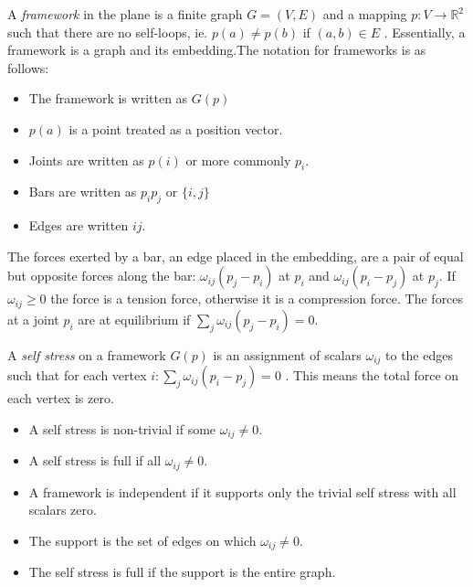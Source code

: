 \documentclass[11pt]{article}
\newcommand{\R}{\mathbb{R}}
\begin{document}
A \emph{framework} in the plane is a finite graph $G=(V,E)$ and a mapping $p: V \rightarrow \R^2$ such that there are no self-loops, ie. $p(a) \neq p(b)$ if $(a,b) \in E$ \cite{mccProof}. Essentially, a framework is a graph and its embedding.The notation for frameworks is as follows: 

\begin{itemize}
	\item The framework is written as $G(p)$
	\item $p(a)$ is a point treated as a position vector. 
	\item Joints are written as $p(i)$ or more commonly $p_i$.
	\item Bars are written as $p_ip_j$ or $\{i,j\}$
	\item Edges are written $ij$.
\end{itemize}

The forces exerted by a bar, an edge placed in the embedding, are a pair of equal but opposite forces along the bar: $\omega_{ij}(p_j - p_i)$ at $p_i$ and $\omega_{ij}(p_i - p_j)$ at $p_j$. If $\omega_{ij} \geq 0$ the force is a tension force, otherwise it is a compression force. The forces at a joint $p_i$ are at equilibrium if $\sum_j \omega_{ij}(p_j-p_i) = 0$\cite{mccProof}.

A \emph{self stress} on a framework $G(p)$ is an assignment of scalars $\omega_{ij}$ to the edges such that for each vertex $i : \sum_j \omega_{ij}(p_i - p_j) = 0$ \cite{mccProof}. This means the total force on each vertex is zero. 
\begin{itemize}
	\item A self stress is non-trivial if some $\omega_{ij} \neq 0$.
	\item A self stress is full if all $\omega_{ij} \neq 0$.
	\item A framework is independent if it supports only the trivial self stress with all scalars zero.
	\item The support is the set of edges on which $\omega_{ij} \neq 0$.
	\item The self stress is full if the support is the entire graph.
\end{itemize}
\end{document}
